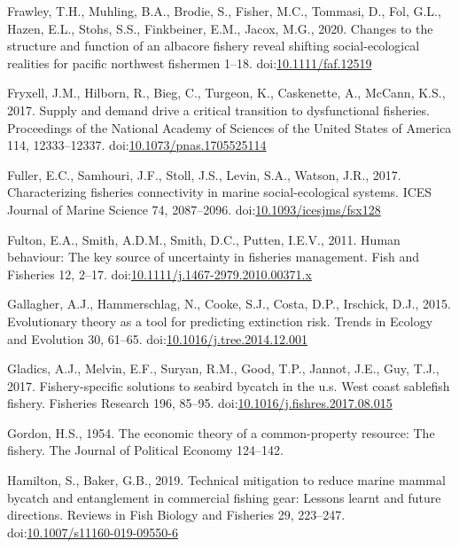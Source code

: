 \documentclass[]{elsarticle} %
\begin{document}
\leavevmode\hypertarget{ref-Frawley2020}{}%
Frawley, T.H., Muhling, B.A., Brodie, S., Fisher, M.C., Tommasi, D.,
Fol, G.L., Hazen, E.L., Stohs, S.S., Finkbeiner, E.M., Jacox, M.G.,
2020. Changes to the structure and function of an albacore fishery
reveal shifting social-ecological realities for pacific northwest
fishermen 1--18.
doi:\href{https://doi.org/10.1111/faf.12519}{10.1111/faf.12519}

\leavevmode\hypertarget{ref-Fryxell2017}{}%
Fryxell, J.M., Hilborn, R., Bieg, C., Turgeon, K., Caskenette, A.,
McCann, K.S., 2017. Supply and demand drive a critical transition to
dysfunctional fisheries. Proceedings of the National Academy of Sciences
of the United States of America 114, 12333--12337.
doi:\href{https://doi.org/10.1073/pnas.1705525114}{10.1073/pnas.1705525114}

\leavevmode\hypertarget{ref-Fuller2017}{}%
Fuller, E.C., Samhouri, J.F., Stoll, J.S., Levin, S.A., Watson, J.R.,
2017. Characterizing fisheries connectivity in marine social-ecological
systems. ICES Journal of Marine Science 74, 2087--2096.
doi:\href{https://doi.org/10.1093/icesjms/fsx128}{10.1093/icesjms/fsx128}

\leavevmode\hypertarget{ref-Fulton2011h}{}%
Fulton, E.A., Smith, A.D.M., Smith, D.C., Putten, I.E.V., 2011. Human
behaviour: The key source of uncertainty in fisheries management. Fish
and Fisheries 12, 2--17.
doi:\href{https://doi.org/10.1111/j.1467-2979.2010.00371.x}{10.1111/j.1467-2979.2010.00371.x}

\leavevmode\hypertarget{ref-Gallagher2015}{}%
Gallagher, A.J., Hammerschlag, N., Cooke, S.J., Costa, D.P., Irschick,
D.J., 2015. Evolutionary theory as a tool for predicting extinction
risk. Trends in Ecology and Evolution 30, 61--65.
doi:\href{https://doi.org/10.1016/j.tree.2014.12.001}{10.1016/j.tree.2014.12.001}

\leavevmode\hypertarget{ref-Gladics2017}{}%
Gladics, A.J., Melvin, E.F., Suryan, R.M., Good, T.P., Jannot, J.E.,
Guy, T.J., 2017. Fishery-specific solutions to seabird bycatch in the
u.s. West coast sablefish fishery. Fisheries Research 196, 85--95.
doi:\href{https://doi.org/10.1016/j.fishres.2017.08.015}{10.1016/j.fishres.2017.08.015}

\leavevmode\hypertarget{ref-Gordon1954}{}%
Gordon, H.S., 1954. The economic theory of a common-property resource:
The fishery. The Journal of Political Economy 124--142.

\leavevmode\hypertarget{ref-Hamilton2019}{}%
Hamilton, S., Baker, G.B., 2019. Technical mitigation to reduce marine
mammal bycatch and entanglement in commercial fishing gear: Lessons
learnt and future directions. Reviews in Fish Biology and Fisheries 29,
223--247.
doi:\href{https://doi.org/10.1007/s11160-019-09550-6}{10.1007/s11160-019-09550-6}
\end{document}
